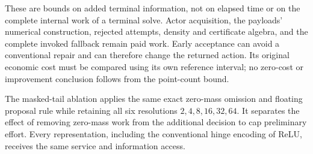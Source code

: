 These are bounds on added terminal information, not on elapsed time or
on the complete internal work of a terminal solve.  Actor acquisition,
the payloads' numerical construction, rejected attempts, density and
certificate algebra, and the complete invoked fallback remain paid work.
Early acceptance can avoid a conventional repair and can therefore
change the returned action.  Its original economic cost must be compared
using its own reference interval; no zero-cost or improvement conclusion
follows from the point-count bound.

The masked-tail ablation applies the same exact zero-mass omission and
floating proposal rule while retaining all six resolutions
$2,4,8,16,32,64$.  It separates the effect of removing zero-mass work
from the additional decision to cap preliminary effort.  Every
representation, including the conventional hinge encoding of ReLU,
receives the same service and information access.
